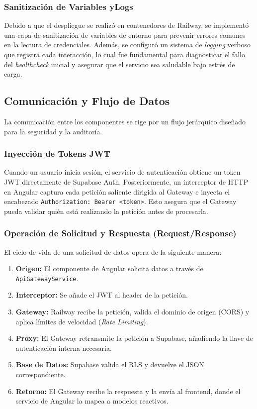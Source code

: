 \documentclass[12pt,a4paper]{article}
\begin{document}
\subsubsection{Sanitización de Variables yLogs}
Debido a que el despliegue se realizó en contenedores de Railway, se implementó una capa de sanitización de variables de entorno para prevenir errores comunes en la lectura de credenciales. Además, se configuró un sistema de \textit{logging} verboso que registra cada interacción, lo cual fue fundamental para diagnosticar el fallo del \textit{healthcheck} inicial y asegurar que el servicio sea saludable bajo estrés de carga.

\subsection{Comunicación y Flujo de Datos}
La comunicación entre los componentes se rige por un flujo jerárquico diseñado para la seguridad y la auditoría. 

\subsubsection{Inyección de Tokens JWT}
Cuando un usuario inicia sesión, el servicio de autenticación obtiene un token JWT directamente de Supabase Auth. Posteriormente, un interceptor de HTTP en Angular captura cada petición saliente dirigida al Gateway e inyecta el encabezado \texttt{Authorization: Bearer <token>}. Esto asegura que el Gateway pueda validar quién está realizando la petición antes de procesarla.

\subsubsection{Operación de Solicitud y Respuesta (Request/Response)}
El ciclo de vida de una solicitud de datos opera de la siguiente manera:
\begin{enumerate}
    \item \textbf{Origen:} El componente de Angular solicita datos a través de \texttt{ApiGatewayService}.
    \item \textbf{Interceptor:} Se añade el JWT al header de la petición.
    \item \textbf{Gateway:} Railway recibe la petición, valida el dominio de origen (CORS) y aplica límites de velocidad (\textit{Rate Limiting}).
    \item \textbf{Proxy:} El Gateway retransmite la petición a Supabase, añadiendo la llave de autenticación interna necesaria.
    \item \textbf{Base de Datos:} Supabase valida el RLS y devuelve el JSON correspondiente.
    \item \textbf{Retorno:} El Gateway recibe la respuesta y la envía al frontend, donde el servicio de Angular la mapea a modelos reactivos.
\end{enumerate}
\end{document}
